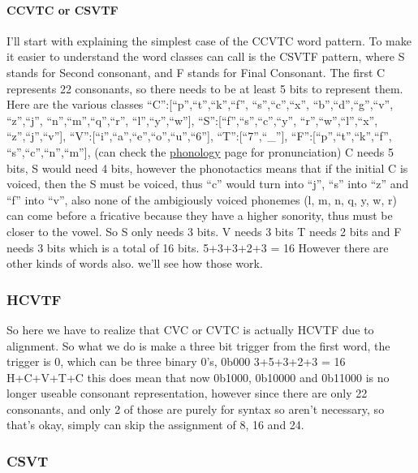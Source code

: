 \paragraph{CCVTC or CSVTF}\label{ccvtc-or-csvtf}

I'll start with explaining the simplest case of the CCVTC word pattern.
To make it easier to understand the word classes can call is the CSVTF
pattern, where S stands for Second consonant, and F stands for Final
Consonant. The first C represents 22 consonants, so there needs to be at
least 5 bits to represent them. Here are the various classes
``C'':{[}``p'',``t'',``k'',``f'', ``s'',``c'',``x'',
``b'',``d'',``g'',``v'', ``z'',``j'', ``n'',``m'',``q'',``r'',
``l'',``y'',``w''{]}, ``S'':{[}``f'',``s'',``c'',``y'',
``r'',``w'',``l'',``x'', ``z'',``j'',``v''{]},
``V'':{[}``i'',``a'',``e'',``o'',``u'',``6''{]},
``T'':{[}``7'',``\_''{]}, ``F'':{[}``p'',``t'',``k'',``f'',
``s'',``c'',``n'',``m''{]}, (can check the
\href{http://wyn.bot.nu/spel/src/vocab/gen/phonology.html}{phonology}
page for pronunciation) C needs 5 bits, S would need 4 bits, however the
phonotactics means that if the initial C is voiced, then the S must be
voiced, thus ``c'' would turn into ``j'', ``s'' into ``z'' and ``f''
into ``v'', also none of the ambigiously voiced phonemes (l, m, n, q, y,
w, r) can come before a fricative because they have a higher sonority,
thus must be closer to the vowel. So S only needs 3 bits. V needs 3 bits
T needs 2 bits and F needs 3 bits which is a total of 16 bits. 5+3+3+2+3
= 16 However there are other kinds of words also. we'll see how those
work.

\subsubsection{HCVTF}\label{hcvtf}

So here we have to realize that CVC or CVTC is actually HCVTF due to
alignment. So what we do is make a three bit trigger from the first
word, the trigger is 0, which can be three binary 0's, 0b000 3+5+3+2+3 =
16 H+C+V+T+C this does mean that now 0b1000, 0b10000 and 0b11000 is no
longer useable consonant representation, however since there are only 22
consonants, and only 2 of those are purely for syntax so aren't
necessary, so that's okay, simply can skip the assignment of 8, 16 and
24.

\subsubsection{CSVT}\label{csvt}


